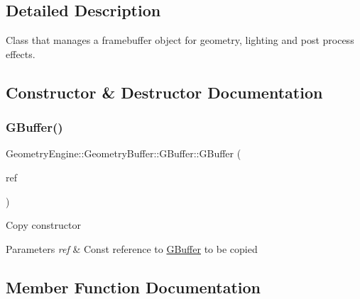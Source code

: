 \subsection{Detailed Description}
Class that manages a framebuffer object for geometry, lighting and post process effects. 

\subsection{Constructor \& Destructor Documentation}
\mbox{\label{class_geometry_engine_1_1_geometry_buffer_1_1_g_buffer_a9b44aaba6f5e1ef02cdc8ab821d560bb}} 
\subsubsection{\texorpdfstring{GBuffer()}{GBuffer()}}
{\footnotesize\ttfamily Geometry\+Engine\+::\+Geometry\+Buffer\+::\+G\+Buffer\+::\+G\+Buffer (\begin{DoxyParamCaption}\item[{const \mbox{\hyperlink{class_geometry_engine_1_1_geometry_buffer_1_1_g_buffer}{G\+Buffer}} \&}]{ref }\end{DoxyParamCaption})}

Copy constructor 
\begin{DoxyParams}{Parameters}
{\em ref} & Const reference to \mbox{\hyperlink{class_geometry_engine_1_1_geometry_buffer_1_1_g_buffer}{G\+Buffer}} to be copied \\
\hline
\end{DoxyParams}


\subsection{Member Function Documentation}
\mbox{\label{class_geometry_engine_1_1_geometry_buffer_1_1_g_buffer_ad64fb7191a7dc256b1282a7f1deab756}} 
